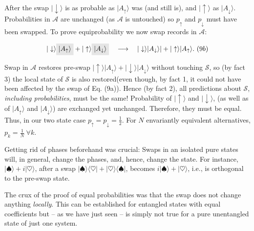 \documentclass[aps,amsmath,amssymb,amsfonts,12pt]{revtex4-1}
\newcommand{\bra}[1]    {\langle #1|}
\newcommand{\ket}[1]    {| #1 \rangle}
\newcommand{\cS}        {{\mathcal S}}
\newcommand{\cA}        {{\mathcal A}}
\newcommand{\+}         {\dagger}
\begin{document}
{\vspace{.2cm} 

\noindent 
After the swap $ \ket \downarrow $ is as probable as $\ket {A_\uparrow}$ was (and still is), and $\ket \uparrow$ as $\ket {A_\downarrow}$.  Probabilities in $\cA$ are unchanged 
(as $\cA$ is untouched) so $p_\uparrow$ and $p_\downarrow$ must have been swapped. To prove equiprobability we now 
swap records in $\cA$:


%
\[
|\downarrow\rangle \tikz[baseline]{
            \node[fill=gray!20,anchor=base] (t3)
            {$| {A_\uparrow}\rangle$};
        } 
+
|\uparrow \rangle
\tikz[baseline]{
            \node[fill=gray!20,anchor=base] (t4)
            {$|{A_\downarrow} \rangle$};
        }
\quad \longrightarrow \quad
|\downarrow\rangle |{A_\downarrow} \rangle| + |\uparrow \rangle | {A_\uparrow}\rangle . \ \eqnum ((9b)
\]
%
%


\noindent  Swap in $\cA$ restores pre-swap $ \ket \uparrow \ket {A_\uparrow}  + \ket \downarrow \ket {A_\downarrow}$ without touching $\cS$, so (by fact 3) the local state of $\cS$  is also restored(even though, by fact 1, it could not have been affected by the swap of Eq. (9a)).
Hence (by fact 2), all predictions about $\cS$, {\it including probabilities}, must be the same!
Probability of $\ket \uparrow$ and $ \ket \downarrow$, (as well as of $\ket {A_\uparrow} $ and $\ket {A_\downarrow}$) are exchanged yet unchanged. Therefore, 
they must be equal. Thus, in our two state case 
$p_\uparrow=p_\downarrow= \frac 1 2$. For $N$ envariantly equivalent alternatives, $p_k= \frac 1 N\ \forall k$.

Getting rid of phases beforehand was crucial:
Swaps in an isolated pure states will, in general, change the phases, and, hence, change the state.  For instance, $\ket \spadesuit + i \ket \heartsuit$, after a swap $\ket \spadesuit \bra \heartsuit + \ket \heartsuit \bra \spadesuit$, becomes
$i \ket \spadesuit + \ket \heartsuit$, i.e., is orthogonal to the pre-swap state. 

The crux of the proof of
equal probabilities was that the swap does not change anything {\it locally}. This can be established
for entangled states with equal coefficients but -- as we have just seen -- is simply not true for a pure
unentangled state of just one system.

}
\end{document}
